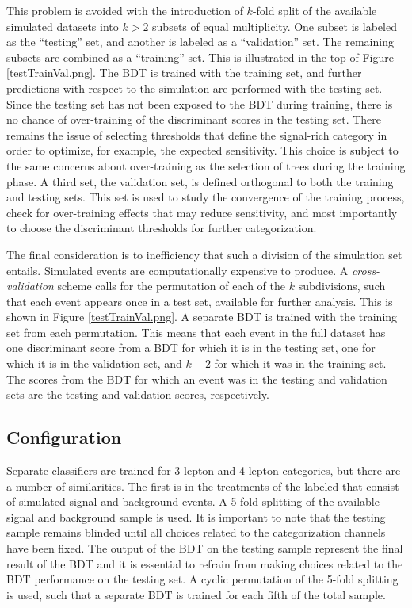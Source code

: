 This problem is avoided with the introduction of $k$-fold split of the available simulated datasets into $k>2$ subsets of equal multiplicity.
One subset is labeled as the ``testing'' set, and another is labeled as a ``validation'' set.
The remaining subsets are combined as a ``training'' set.
This is illustrated in the top of Figure \ref{testTrainVal.png}.
The BDT is trained with the training set, and further predictions with respect to the simulation are performed with the testing set.
Since the testing set has not been exposed to the BDT during training, there is no chance of over-training of the discriminant scores in the testing set.
There remains the issue of selecting thresholds that define the signal-rich category in order to optimize, for example, the expected sensitivity.
This choice is subject to the same concerns about over-training as the selection of trees during the training phase. 
A third set, the validation set, is defined orthogonal to both the training and testing sets.
This set is used to study the convergence of the training process, check for over-training effects that may reduce sensitivity, and most importantly to choose the discriminant thresholds for further categorization.

The final consideration is to inefficiency that such a division of the simulation set entails.
Simulated events are computationally expensive to produce.
A \emph{cross-validation} scheme calls for the permutation of each of the $k$ subdivisions, such that each event appears once in a test set, available for further analysis.
This is shown in Figure \ref{testTrainVal.png}.
A separate BDT is trained with the training set from each permutation.
This means that each event in the full dataset has one discriminant score from a BDT for which it is in the testing set, one for which it is in the validation set, and $k-2$ for which it was in the training set.
The scores from the BDT for which an event was in the testing and validation sets are the testing and validation scores, respectively.

\subsection{Configuration}
\label{sec:hmmBdtConfiguration}

Separate classifiers are trained for 3-lepton and 4-lepton categories, but there are a number of similarities.
The first is in the treatments of the labeled that consist of simulated signal and background events.
A 5-fold splitting of the available signal and background sample is used.
It is important to note that the testing sample remains blinded until all choices related to the categorization channels have been fixed.
The output of the BDT on the testing sample represent the final result of the BDT and it is essential to refrain from making choices related to the BDT performance on the testing set.
A cyclic permutation of the 5-fold splitting is used, such that a separate BDT is trained for each fifth of the total sample.

